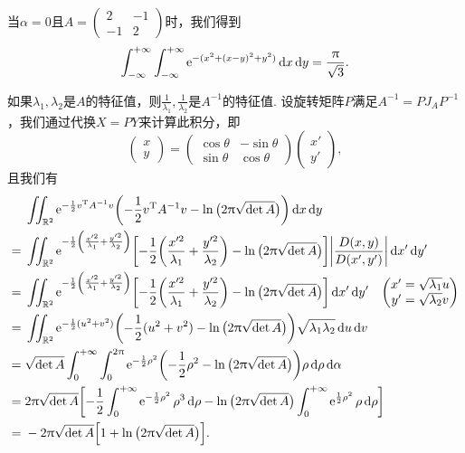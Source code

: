 \begin{solution}
  当$\alpha=0$且$A=\begin{pmatrix}
    2 & -1 \\
    -1 & 2
  \end{pmatrix}$时，我们得到 \cite[Problem 2.3.3, P.40]{58}
  \[
    \int_{-\infty}^{+\infty}\int_{-\infty}^{+\infty}
    \operatorname{\!\!\;\mathrm e}^{-(x^2+(x-y)^2+y^2)}\mathop{}\!\mathrm d x \mathop{}\!\mathrm d y = \frac{\uppi}{\sqrt3}.
  \]
\end{solution}

\begin{solution}
  如果$\lambda_1,\lambda_2$是$A$的特征值，则$\frac1{\lambda_1},\frac1{\lambda_2}$是$A^{-1}$的特征值. 设旋转矩阵$P$满足$A^{-1}=PJ_AP^{-1}$，我们通过代换$X=PY$来计算此积分，即
  \[
    \begin{pmatrix}
      x \\ y
    \end{pmatrix} =
    \begin{pmatrix}
      \cos\theta & -\sin\theta \\
      \sin\theta & \cos\theta
    \end{pmatrix}
    \begin{pmatrix}
      x' \\ y'
    \end{pmatrix},
  \]
  且我们有
  \begin{align*}
    & \iint_{\MR^2} \ee^{-\frac12v\TT A^{-1}v}\left( -\frac12v\TT A^{-1}v - \ln\big( 2\pi\sqrt{\det A} \big) \right) \dif x\dif y \\
    = {}& \iint_{\MR^2} \ee^{-\frac12\left( \frac{x'^2}{\lambda_1}+\frac{y'^2}{\lambda_2}
    \right)} \left[
      -\frac12\left( \frac{x'^2}{\lambda_1}+\frac{y'^2}{\lambda_2}
    \right) - \ln\big( 2\pi\sqrt{\det A} \big)
    \right]\left| \frac{D(x,y)}{D(x',y')} \right| \dif x' \dif y' \\
    = {}& \iint_{\MR^2} \ee^{-\frac12\left( \frac{x'^2}{\lambda_1}+\frac{y'^2}{\lambda_2}
    \right)} \left[
      -\frac12\left( \frac{x'^2}{\lambda_1}+\frac{y'^2}{\lambda_2}
    \right) - \ln\big( 2\pi\sqrt{\det A} \big)
    \right] \dif x' \dif y' \quad \begin{pmatrix}
      x' = \sqrt{\lambda_1}u \\
      y' = \sqrt{\lambda_2}v
    \end{pmatrix} \\
    = {}& \iint_{\MR^2}\ee^{-\frac12(u^2+v^2)}\left(
      -\frac12(u^2+v^2) - \ln\big( 2\pi\sqrt{\det A} \big)
    \right) \sqrt{\lambda_1\lambda_2}\dif u \dif v \\
    = {}& \sqrt{\det A} \int_0^{+\infty}\int_0^{2\pi} \ee^{-\frac12\rho^2}\left( -\frac12\rho^2 - \ln\big( 2\pi\sqrt{\det A} \big) \right)\rho\dif \rho \dif\alpha \\
    = {}& 2\pi\sqrt{\det A}\left[
      -\frac12\int_0^{+\infty}\ee^{-\frac12\rho^2}\rho^3
      \dif \rho - \ln \big( 2\pi\sqrt{\det A} \big) \int_0^{+\infty}\ee^{\frac12\rho^2}\rho\dif \rho \right] \\
    = {}& -2\pi\sqrt{\det A}\left[ 1 + \ln \big( 2\pi\sqrt{\det A} \big) \right].
  \end{align*}
\end{solution}

